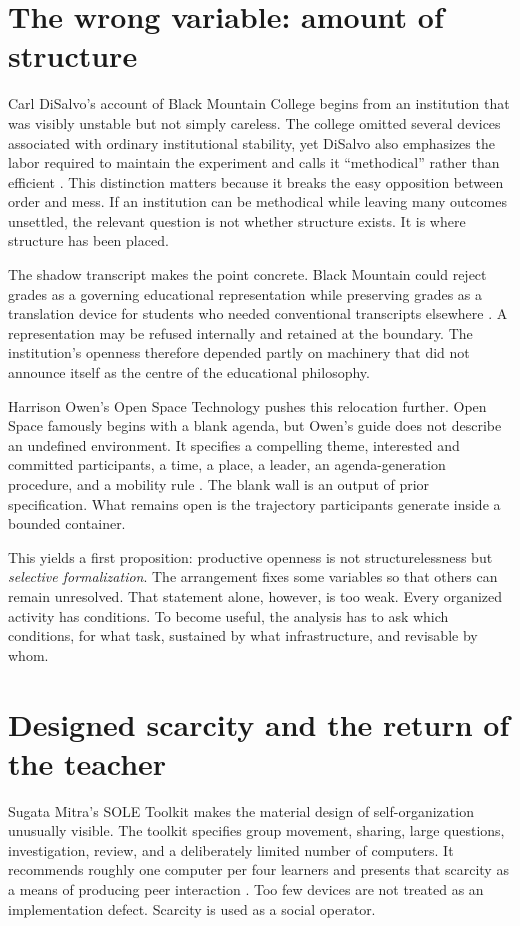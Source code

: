 \documentclass[11pt]{article}
\begin{document}
\section{The wrong variable: amount of structure}
Carl DiSalvo's account of Black Mountain College begins from an institution that was visibly unstable but not simply careless. The college omitted several devices associated with ordinary institutional stability, yet DiSalvo also emphasizes the labor required to maintain the experiment and calls it ``methodical'' rather than efficient \cite{disalvo2026blackmountainmess}. This distinction matters because it breaks the easy opposition between order and mess. If an institution can be methodical while leaving many outcomes unsettled, the relevant question is not whether structure exists. It is where structure has been placed.

The shadow transcript makes the point concrete. Black Mountain could reject grades as a governing educational representation while preserving grades as a translation device for students who needed conventional transcripts elsewhere \cite{disalvo2026blackmountainmess}. A representation may be refused internally and retained at the boundary. The institution's openness therefore depended partly on machinery that did not announce itself as the centre of the educational philosophy.

Harrison Owen's Open Space Technology pushes this relocation further. Open Space famously begins with a blank agenda, but Owen's guide does not describe an undefined environment. It specifies a compelling theme, interested and committed participants, a time, a place, a leader, an agenda-generation procedure, and a mobility rule \cite{owen_open_space_guide}. The blank wall is an output of prior specification. What remains open is the trajectory participants generate inside a bounded container.

This yields a first proposition: productive openness is not structurelessness but \emph{selective formalization}. The arrangement fixes some variables so that others can remain unresolved. That statement alone, however, is too weak. Every organized activity has conditions. To become useful, the analysis has to ask which conditions, for what task, sustained by what infrastructure, and revisable by whom.

\section{Designed scarcity and the return of the teacher}
Sugata Mitra's SOLE Toolkit makes the material design of self-organization unusually visible. The toolkit specifies group movement, sharing, large questions, investigation, review, and a deliberately limited number of computers. It recommends roughly one computer per four learners and presents that scarcity as a means of producing peer interaction \cite{mitra_sole_toolkit}. Too few devices are not treated as an implementation defect. Scarcity is used as a social operator.
\end{document}
